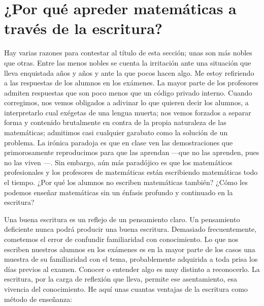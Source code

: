 \section{¿Por qué apreder matemáticas a través de la escritura?}

Hay varias razones para contestar al título de esta sección; unas son más nobles que otras.
Entre las menos nobles se cuenta la irritación ante una situación que lleva enquistada años y años y ante la que pocos hacen algo.
Me estoy refiriendo a las respuestas de los alumnos en los exámenes.
La mayor parte de los profesores admiten respuestas que son poco menos que un código privado interno.
Cuando corregimos, nos vemos obligados a adivinar lo que quieren decir los alumnos, a interpretarlo cual exégetas de
una lengua muerta; nos vemos forzados a separar forma y contenido brutalmente en contra de la propia naturaleza de las matemáticas; admitimos casi cualquier garabato como la solución de un problema.
La irónica paradoja es que en clase ven las demostraciones que primorosamente reproducimos para que las aprendan —que
no las aprenden, pues no las viven —.
Sin embargo, aún más paradójico es que los matemáticos profesionales y los profesores de matemáticas están escribiendo
matemáticas todo el tiempo.
¿Por qué los alumnos no escriben matemáticas también?
¿Cómo les podemos enseñar matemáticas sin un énfasis profundo y continuado en la escritura?

Una buena escritura es un reflejo de un pensamiento claro.
Un pensamiento deficiente nunca podrá producir una buena escritura.
Demasiado frecuentemente, cometemos el error de confundir familiaridad con conocimiento.
Lo que nos escriben nuestros alumnos en los exámenes es en la mayor parte de los casos una muestra de su familiaridad
con el tema, probablemente adquirida a toda prisa los días previos al examen.
Conocer o entender algo es muy distinto a reconocerlo.
La escritura, por la carga de reflexión que lleva, permite ese
asentamiento, esa vivencia del conocimiento.
He aquí unas cuantas ventajas de la escritura como método de enseñanza:

